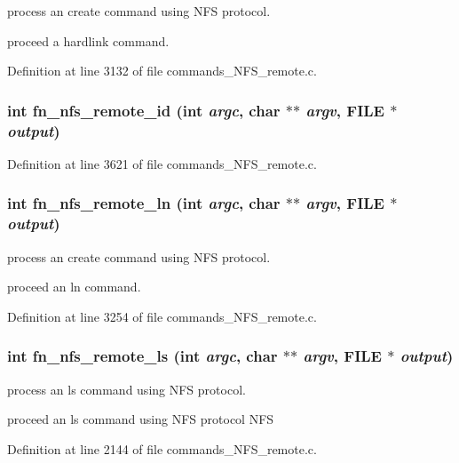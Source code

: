 process an create command using NFS protocol.

proceed a hardlink command. 

Definition at line 3132 of file commands\_\-NFS\_\-remote.c.
\subsubsection[{fn\_\-nfs\_\-remote\_\-id}]{\setlength{\rightskip}{0pt plus 5cm}int fn\_\-nfs\_\-remote\_\-id (int {\em argc}, \/  char $\ast$$\ast$ {\em argv}, \/  FILE $\ast$ {\em output})}\label{commands_8h_dfe70596d1556c3acd01ba17fbe7bda8}




Definition at line 3621 of file commands\_\-NFS\_\-remote.c.
\subsubsection[{fn\_\-nfs\_\-remote\_\-ln}]{\setlength{\rightskip}{0pt plus 5cm}int fn\_\-nfs\_\-remote\_\-ln (int {\em argc}, \/  char $\ast$$\ast$ {\em argv}, \/  FILE $\ast$ {\em output})}\label{commands_8h_e4a85d683c2bf488befc5192af4a2490}


process an create command using NFS protocol.

proceed an ln command. 

Definition at line 3254 of file commands\_\-NFS\_\-remote.c.
\subsubsection[{fn\_\-nfs\_\-remote\_\-ls}]{\setlength{\rightskip}{0pt plus 5cm}int fn\_\-nfs\_\-remote\_\-ls (int {\em argc}, \/  char $\ast$$\ast$ {\em argv}, \/  FILE $\ast$ {\em output})}\label{commands_8h_2f6620b40e586fff30ce7325049d29a7}


process an ls command using NFS protocol.

proceed an ls command using NFS protocol NFS 

Definition at line 2144 of file commands\_\-NFS\_\-remote.c.

